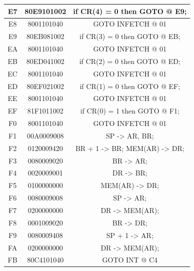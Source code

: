 \begin{center}
\begin{tabular}{|c|c|c|}
        E7    & 80E9101002   & if CR(4) = 0 then GOTO @ E9;          \\
        \hline
        E8    & 8001101040   & GOTO INFETCH @ 01                     \\
        \hline
        E9    & 80EB081002   & if CR(3) = 0 then GOTO @ EB;          \\
        \hline
        EA    & 8001101040   & GOTO INFETCH @ 01                     \\
        \hline
        EB    & 80ED041002   & if CR(2) = 0 then GOTO @ ED;          \\
        \hline
        EC    & 8001101040   & GOTO INFETCH @ 01                     \\
        \hline
        ED    & 80EF021002   & if CR(1) = 0 then GOTO @ EF;          \\
        \hline
        EE    & 8001101040   & GOTO INFETCH @ 01                     \\
        \hline
        EF    & 81F1011002   & if CR(0) = 1 then GOTO @ F1;          \\
        \hline
        F0    & 8001101040   & GOTO INFETCH @ 01                     \\
        \hline
        F1    & 00A0009008   & SP -> AR, BR;                         \\
        \hline
        F2    & 0120009420   & BR + 1 -> BR; MEM(AR) -> DR;          \\
        \hline
        F3    & 0080009020   & BR -> AR;                             \\
        \hline
        F4    & 0020009001   & DR -> BR;                             \\
        \hline
        F5    & 0100000000   & MEM(AR) -> DR;                        \\
        \hline
        F6    & 0080009008   & SP -> AR;                             \\
        \hline
        F7    & 0200000000   & DR -> MEM(AR);                        \\
        \hline
        F8    & 0001009020   & BR -> DR;                             \\
        \hline
        F9    & 0080009408   & SP + 1 -> AR;                         \\
        \hline
        FA    & 0200000000   & DR -> MEM(AR);                        \\
        \hline
        FB    & 80C4101040   & GOTO INT @ C4                         \\
        \hline
    \end{tabular}
\end{center}


